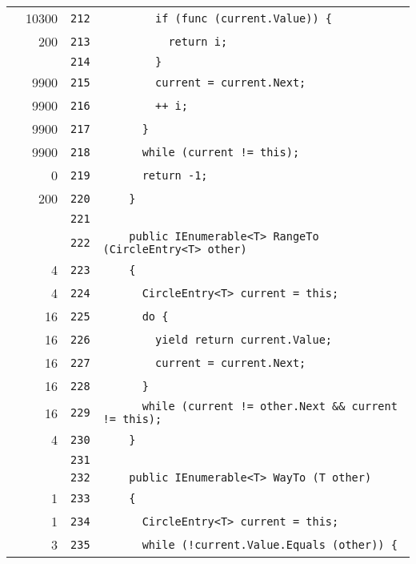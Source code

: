 \documentclass[a4paper,10pt]{article}
\begin{document}
\begin{longtable}[l]{lrrl}
\cellcolor{green} & 10300 & \verb~212~ & \verb~        if (func (current.Value)) {~\\
\cellcolor{green} & 200 & \verb~213~ & \verb~          return i;~\\
\cellcolor{gray} &  & \verb~214~ & \verb~        }~\\
\cellcolor{green} & 9900 & \verb~215~ & \verb~        current = current.Next;~\\
\cellcolor{green} & 9900 & \verb~216~ & \verb~        ++ i;~\\
\cellcolor{green} & 9900 & \verb~217~ & \verb~      }~\\
\cellcolor{green} & 9900 & \verb~218~ & \verb~      while (current != this);~\\
\cellcolor{red} & 0 & \verb~219~ & \verb~      return -1;~\\
\cellcolor{green} & 200 & \verb~220~ & \verb~    }~\\
\cellcolor{gray} &  & \verb~221~ & \verb~~\\
\cellcolor{gray} &  & \verb~222~ & \verb~    public IEnumerable<T> RangeTo (CircleEntry<T> other)~\\
\cellcolor{green} & 4 & \verb~223~ & \verb~    {~\\
\cellcolor{green} & 4 & \verb~224~ & \verb~      CircleEntry<T> current = this;~\\
\cellcolor{green} & 16 & \verb~225~ & \verb~      do {~\\
\cellcolor{green} & 16 & \verb~226~ & \verb~        yield return current.Value;~\\
\cellcolor{green} & 16 & \verb~227~ & \verb~        current = current.Next;~\\
\cellcolor{green} & 16 & \verb~228~ & \verb~      }~\\
\cellcolor{green} & 16 & \verb~229~ & \verb~      while (current != other.Next && current != this);~\\
\cellcolor{green} & 4 & \verb~230~ & \verb~    }~\\
\cellcolor{gray} &  & \verb~231~ & \verb~~\\
\cellcolor{gray} &  & \verb~232~ & \verb~    public IEnumerable<T> WayTo (T other)~\\
\cellcolor{green} & 1 & \verb~233~ & \verb~    {~\\
\cellcolor{green} & 1 & \verb~234~ & \verb~      CircleEntry<T> current = this;~\\
\cellcolor{green} & 3 & \verb~235~ & \verb~      while (!current.Value.Equals (other)) {~\\

\end{longtable}
\end{document}
